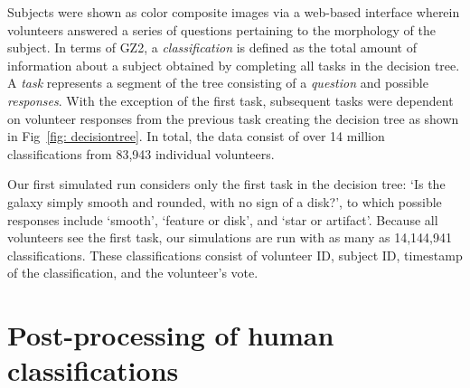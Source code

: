 \documentclass[twocolumn]{aastex6}
\begin{document}
Subjects were shown as color composite images via a web-based interface wherein 
volunteers answered a series of questions pertaining to the morphology of the subject.
In terms of GZ2, a \textit{classification} is defined as the total amount of information about a subject 
obtained by completing all tasks in the decision tree. A \textit{task} represents a segment of the
tree consisting of a \textit{question} and possible \textit{responses}. 
With the exception of the first task, subsequent tasks were
dependent on volunteer responses from the previous task creating the decision tree 
as shown in Fig~\ref{fig: decisiontree}.
 In total, the data consist of over 14 million classifications from 83,943 individual volunteers. 



Our first simulated run considers only the first task in the decision tree: 
`Is the galaxy simply smooth and rounded, with no sign of a disk?', to which possible 
responses include `smooth', `feature or disk', and `star or artifact'.  Because all 
volunteers see the first task, our simulations are run with as many as 14,144,941 
classifications.  These classifications consist of volunteer ID, subject ID, 
timestamp of the classification,  and the volunteer's vote.



\section{Post-processing of human classifications}
\end{document}
